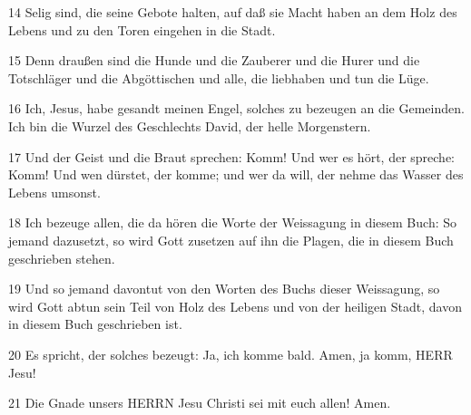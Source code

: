 \par 14 Selig sind, die seine Gebote halten, auf daß sie Macht haben an dem Holz des Lebens und zu den Toren eingehen in die Stadt.
\par 15 Denn draußen sind die Hunde und die Zauberer und die Hurer und die Totschläger und die Abgöttischen und alle, die liebhaben und tun die Lüge.
\par 16 Ich, Jesus, habe gesandt meinen Engel, solches zu bezeugen an die Gemeinden. Ich bin die Wurzel des Geschlechts David, der helle Morgenstern.
\par 17 Und der Geist und die Braut sprechen: Komm! Und wer es hört, der spreche: Komm! Und wen dürstet, der komme; und wer da will, der nehme das Wasser des Lebens umsonst.
\par 18 Ich bezeuge allen, die da hören die Worte der Weissagung in diesem Buch: So jemand dazusetzt, so wird Gott zusetzen auf ihn die Plagen, die in diesem Buch geschrieben stehen.
\par 19 Und so jemand davontut von den Worten des Buchs dieser Weissagung, so wird Gott abtun sein Teil von Holz des Lebens und von der heiligen Stadt, davon in diesem Buch geschrieben ist.
\par 20 Es spricht, der solches bezeugt: Ja, ich komme bald. Amen, ja komm, HERR Jesu!
\par 21 Die Gnade unsers HERRN Jesu Christi sei mit euch allen! Amen.

